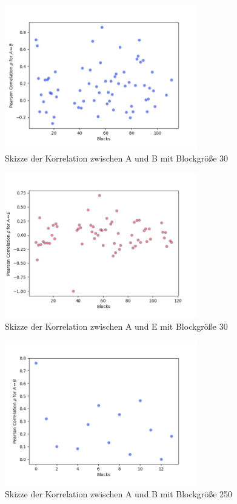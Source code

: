 \documentclass[12pt,a4paper]{article}
\begin{document}
\begin{figure}[hbt!]
	\centering
		\includegraphics[width=0.75\textwidth ]
		{Bilder/a3-t1-block30-correlation-AB.png}
		\caption{Skizze der Korrelation zwischen A und B mit Blockgröße 30}
		\label{fig:Label2}
\end{figure}

\begin{figure}[hbt!]
	\centering
		\includegraphics[width=0.75\textwidth ]
		{Bilder/a3-t1-block30-correlation-AE.png}
		\caption{Skizze der Korrelation zwischen A und E mit Blockgröße 30}
		\label{fig:Label3}
\end{figure}
\clearpage


\begin{figure}[hbt!]
	\centering
		\includegraphics[width=0.75\textwidth ]
		{Bilder/a3-t1-block250-correlation-AB.png}
		\caption{Skizze der Korrelation zwischen A und B mit Blockgröße 250}
		\label{fig:Label4}
\end{figure}
\end{document}
